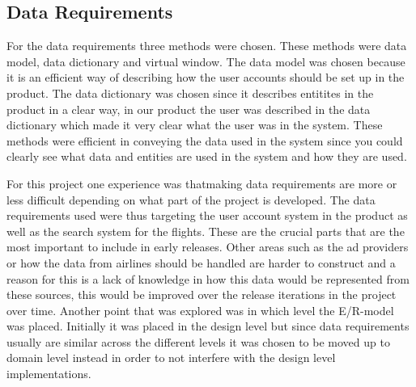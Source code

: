 \subsection{Data Requirements}

For the data requirements three methods were chosen. These methods were data model, data dictionary and virtual window. The data model was chosen because it is an efficient
way of describing how the user accounts should be set up in the product. The data dictionary was chosen since it describes entitites in the product in a clear way, in our product the
user was described in the data dictionary which made it very clear what the user was in the system. These methods were efficient in conveying the data used in the system since you could
clearly see what data and entities are used in the system and how they are used.

For this project one experience was thatmaking data requirements are more or less difficult depending on what part of the project is developed. The data requirements used were thus targeting the user
account system in the product as well as the search system for the flights. These are the crucial parts that are the most important to include in early releases.
Other areas such as the ad providers or how the data from airlines should be handled are harder to construct and a reason for this is a lack of knowledge in
how this data would be represented from these sources, this would be improved over the release iterations in the project over time. Another point that was explored was in which level the E/R-model was placed.
Initially it was placed in the design level but since data requirements usually are similar across the different levels it was chosen to be moved up to domain level instead in order to not interfere with the 
design level implementations.
